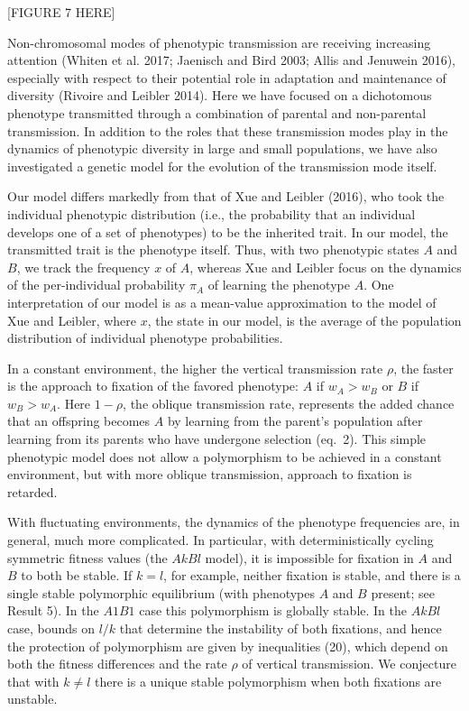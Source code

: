   
 \medskip
\centerline{[FIGURE 7 HERE]}  
  \bigskip
 
 \smallskip

Non-chromosomal modes of phenotypic transmission are receiving increasing attention (Whiten et al. 2017; Jaenisch and Bird 2003; Allis and Jenuwein 2016), especially with respect to their potential role in adaptation and maintenance of diversity (Rivoire and Leibler 2014). Here we have focused on a dichotomous phenotype transmitted through a combination of parental and non-parental transmission. In addition to the roles that these transmission modes play in the dynamics of phenotypic diversity in large and small populations, we have also investigated a genetic model for the evolution of the transmission mode itself.

Our model differs markedly from that of Xue and Leibler (2016), who took the individual phenotypic distribution (i.e., the probability that an individual develops one of a set of phenotypes) to be the inherited trait. In our model, the transmitted trait is the phenotype itself. Thus, with two phenotypic states $A$ and $B$, we track the frequency $x$ of $A$, whereas Xue and Leibler focus on the dynamics of the per-individual probability $\pi_A$ of learning the phenotype $A$. One interpretation of our model is as a mean-value approximation to the model of Xue and Leibler, where $x$, the state in our model, is the average of the population distribution of individual phenotype probabilities. 

In a constant environment, the higher the vertical transmission rate $\rho$, the faster is the approach to fixation of the favored phenotype: $A$ if $w_A>w_B$ or $B$ if $w_B>w_A$. Here $1-\rho$, the oblique transmission rate, represents the added chance that an offspring becomes $A$ by learning from the parent's population after learning from its parents who have undergone selection (eq.\ 2). This simple phenotypic model does not allow a polymorphism to be achieved in a constant environment, but with more oblique transmission, approach to fixation is retarded.

 With fluctuating environments, the dynamics of the phenotype frequencies are, in general, much more complicated. In particular, with deterministically cycling symmetric fitness values (the $AkBl$ model), it is impossible for fixation in $A$ and $B$ to both be stable. If $k=l$, for example, neither fixation is stable, and there is a single stable polymorphic equilibrium (with phenotypes $A$ and $B$ present; see Result 5). In the $A1B1$ case this  polymorphism is globally stable. In the $AkBl$ case, bounds on $l/k$ that determine the instability of both fixations, and hence the protection of polymorphism are given by inequalities (20), which depend on both the fitness differences and the rate $\rho$ of vertical transmission. We conjecture that with $k\ne l$ there is a unique stable polymorphism when both fixations are unstable.
 
